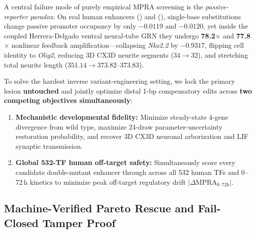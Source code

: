 \documentclass[10.5pt,a4paper]{article}
\begin{document}
A central failure mode of purely empirical MPRA screening is the \emph{passive-reporter paradox}. On real human enhancers  () and  (), single-base substitutions change passive promoter occupancy by only $-0.0119$ and $-0.0120$, yet inside the coupled Herrera-Delgado ventral neural-tube GRN they undergo \textbf{78.2$\times$} and \textbf{77.8$\times$} nonlinear feedback amplification—collapsing \emph{Nkx2.2} by $-0.9317$, flipping cell identity to \emph{Olig2}, reducing 3D CX3D neurite segments ($34\to 32$), and stretching total neurite length ($351.14\to 373.82$--$373.83$).

To solve the hardest inverse variant-engineering setting, we lock the primary lesion \textbf{untouched} and jointly optimize distal 1-bp compensatory edits across \textbf{two competing objectives simultaneously}:
\begin{enumerate}
\item \textbf{Mechanistic developmental fidelity:} Minimize steady-state 4-gene divergence from wild type, maximize 24-draw parameter-uncertainty restoration probability, and recover 3D CX3D neuronal arborization and LIF synaptic transmission.
\item \textbf{Global 532-TF human off-target safety:} Simultaneously score every candidate double-mutant enhancer through  across all 532 human TFs and 0--72\,h kinetics to minimize peak off-target regulatory drift $|\Delta\text{MPRA}_{0\text{--}72\text{h}}|$.
\end{enumerate}

\subsection{Machine-Verified Pareto Rescue and Fail-Closed Tamper Proof}
\end{document}
